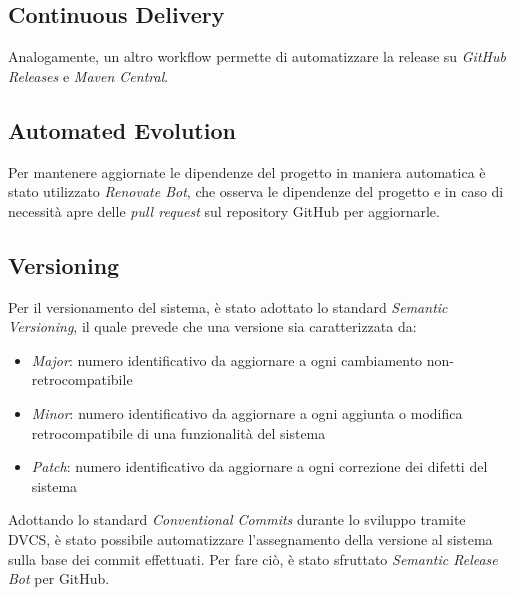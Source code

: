 \subsection{Continuous Delivery}
Analogamente, un altro workflow permette di automatizzare la release su \textit{GitHub Releases} e \textit{Maven Central}.

\subsection{Automated Evolution}
Per mantenere aggiornate le dipendenze del progetto in maniera automatica è stato utilizzato \textit{Renovate Bot}, che osserva
le dipendenze del progetto e in caso di necessità apre delle \textit{pull request} sul repository GitHub per aggiornarle.

\subsection{Versioning}
Per il versionamento del sistema, è stato adottato lo standard \textit{Semantic Versioning}, il quale prevede che una versione
sia caratterizzata da:
\begin{itemize}
    \item \textit{Major}: numero identificativo da aggiornare a ogni cambiamento non-retrocompatibile
    \item \textit{Minor}: numero identificativo da aggiornare a ogni aggiunta o modifica retrocompatibile di una funzionalità del
    sistema
    \item \textit{Patch}: numero identificativo da aggiornare a ogni correzione dei difetti del sistema
\end{itemize}

Adottando lo standard \textit{Conventional Commits} durante lo sviluppo tramite DVCS, è stato possibile
automatizzare l'assegnamento della versione al sistema sulla base dei commit effettuati. Per fare ciò, è stato sfruttato
\textit{Semantic Release Bot} per GitHub.